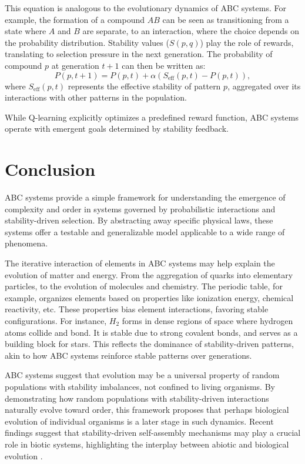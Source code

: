 \documentclass[entropy,article,submit,pdftex,moreauthors]{Definitions/mdpi}
\begin{document}
This equation is analogous to the evolutionary dynamics of ABC systems. For example, the formation of a compound \( AB \) can be seen as transitioning from a state where \( A \) and \( B \) are separate, to an interaction, where the choice depends on the probability distribution. Stability values (\( S(p, q) \)) play the role of rewards, translating to selection pressure in the next generation. The probability of compound \( p \) at generation \( t+1 \) can then be written as:
\[
P(p, t+1) = P(p, t) + \alpha \left( S_{\text{eff}}(p, t) - P(p, t) \right),
\]
where \( S_{\text{eff}}(p, t) \) represents the effective stability of pattern \( p \), aggregated over its interactions with other patterns in the population.

While Q-learning explicitly optimizes a predefined reward function, ABC systems operate with emergent goals determined by stability feedback. 

\section{Conclusion}

ABC systems provide a simple framework for understanding the emergence of complexity and order in systems governed by probabilistic interactions and stability-driven selection. By abstracting away specific physical laws, these systems offer a testable and generalizable model applicable to a wide range of phenomena. 

The iterative interaction of elements in ABC systems may help explain the evolution of matter and energy. From the aggregation of quarks into elementary particles, to the evolution of molecules and chemistry. The periodic table, for example, organizes elements based on properties like ionization energy, chemical reactivity, etc. These properties bias element interactions, favoring stable configurations. For instance, \( H_2 \) forms in dense regions of space where hydrogen atoms collide and bond. It is stable due to strong covalent bonds, and serves as a building block for stars. This reflects the dominance of stability-driven patterns, akin to how ABC systems reinforce stable patterns over generations. 

ABC systems suggest that evolution may be a universal property of random populations with stability imbalances, not confined to living organisms. By demonstrating how random populations with stability-driven interactions naturally evolve toward order, this framework proposes that perhaps biological evolution of individual organisms is a later stage in such dynamics. Recent findings suggest that stability-driven self-assembly mechanisms may play a crucial role in biotic systems, highlighting the interplay between abiotic and biological evolution \cite{davies2022selfassembly}.
\end{document}
